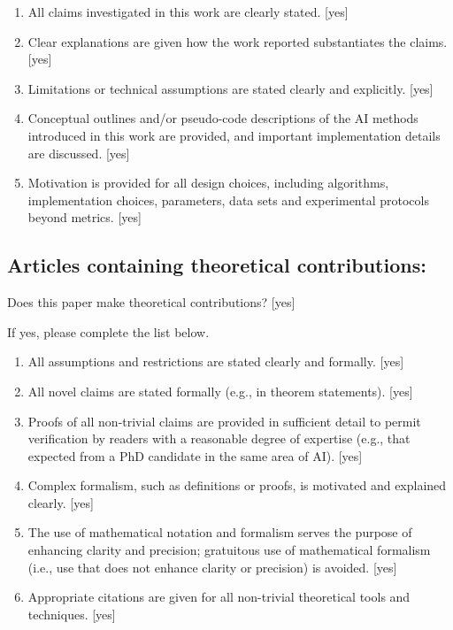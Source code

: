 \documentclass[manuscript, screen, review]{jair}
\begin{document}
\begin{enumerate}
    \item All claims investigated in this work are clearly stated. 
    [yes]
    \item Clear explanations are given how the work reported substantiates the claims. 
    [yes]
    \item Limitations or technical assumptions are stated clearly and explicitly. 
    [yes]
    \item Conceptual outlines and/or pseudo-code descriptions of the AI methods introduced in this work are provided, and important implementation details are discussed. 
    [yes]
    \item 
    Motivation is provided for all design choices, including algorithms, implementation choices, parameters, data sets and experimental protocols beyond metrics.
    [yes]
\end{enumerate}

\subsection*{Articles containing theoretical contributions:}
Does this paper make theoretical contributions? 
[yes] 

If yes, please complete the list below.

\begin{enumerate}
    \item All assumptions and restrictions are stated clearly and formally. 
    [yes]
    \item All novel claims are stated formally (e.g., in theorem statements). 
    [yes]
    \item Proofs of all non-trivial claims are provided in sufficient detail to permit verification by readers with a reasonable degree of expertise (e.g., that expected from a PhD candidate in the same area of AI). [yes]
    \item
    Complex formalism, such as definitions or proofs, is motivated and explained clearly.
    [yes]
    \item 
    The use of mathematical notation and formalism serves the purpose of enhancing clarity and precision; gratuitous use of mathematical formalism (i.e., use that does not enhance clarity or precision) is avoided.
    [yes]
    \item 
    Appropriate citations are given for all non-trivial theoretical tools and techniques. 
    [yes]
\end{enumerate}
\end{document}
